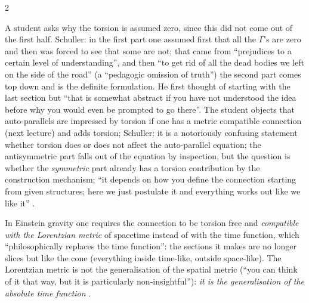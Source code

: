 \begin{paracol}{2}
\begin{coursenote}
A student asks why the torsion is assumed zero, since this did not come out of the first half. Schuller: in the first part one assumed first that all the $\Gamma$'s are zero and then was forced to see that some are not; that came from ``prejudices to a certain level of understanding'', and then ``to get rid of all the dead bodies we left on the side of the road'' (a ``pedagogic omission of truth'') the second part comes top down and is the definite formulation. He first thought of starting with the last section but ``that is somewhat abstract if you have not understood the idea before why you would even be prompted to go there''. The student objects that auto-parallels are impressed by torsion if one has a metric compatible connection (next lecture) and adds torsion; Schuller: it is a notoriously confusing statement whether torsion does or does not affect the auto-parallel equation; the antisymmetric part falls out of the equation by inspection, but the question is whether the \emph{symmetric} part already has a torsion contribution by the construction mechanism; ``it depends on how you define the connection starting from given structures; here we just postulate it and everything works out like we like it'' .
\end{coursenote}
In Einstein gravity one requires the connection to be torsion free and \emph{compatible with the Lorentzian metric} of spacetime instead of with the time function, which ``philosophically replaces the time function'': the sections it makes are no longer slices but like the cone (everything inside time-like, outside space-like). The Lorentzian metric is not the generalisation of the spatial metric (``you can think of it that way, but it is particularly non-insightful''): \emph{it is the generalisation of the absolute time function} .


\end{paracol}

